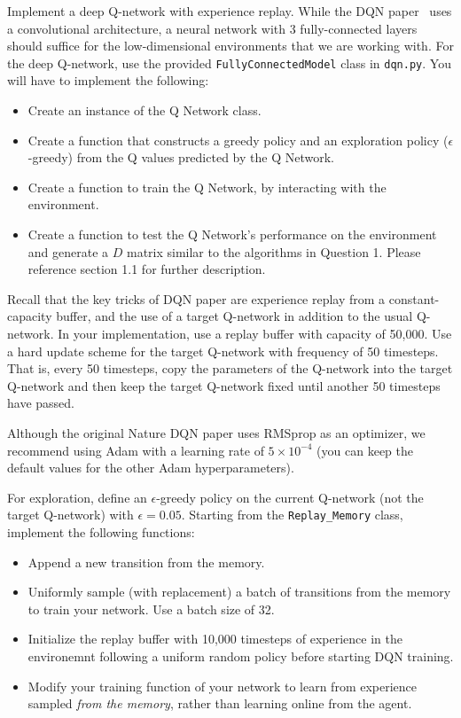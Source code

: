 \documentclass[12pt]{article}
\begin{document}
	Implement a deep Q-network with experience replay. 
	While the DQN paper~\cite{mnih2015human} uses a convolutional architecture, a neural network with 3 fully-connected layers should suffice for the low-dimensional environments that we are working with. For the deep Q-network, use the provided \texttt{FullyConnectedModel} class in \texttt{dqn.py}. You will have to implement the following:
    \begin{itemize}
        \item Create an instance of the Q Network class.
        \item Create a function that constructs a greedy policy and an exploration policy ($\epsilon$-greedy) from the Q values predicted by the Q Network.
        \item Create a function to train the Q Network, by interacting with the environment.
        \item  Create a function to test the Q Network's performance on the environment and generate a $D$ matrix similar to the algorithms in Question 1. Please reference section 1.1 for further description.
    \end{itemize}
   
   Recall that the key tricks of DQN paper are experience replay from a constant-capacity buffer, and the use of a target Q-network in addition to the usual Q-network. In your implementation, use a replay buffer with capacity of 50,000. Use a hard update scheme for the target Q-network with frequency of 50 timesteps. That is, every 50 timesteps, copy the parameters of the Q-network into the target Q-network and then keep the target Q-network fixed until another 50 timesteps have passed.
   
   Although the original Nature DQN paper uses RMSprop as an optimizer, we recommend using Adam with a learning rate of $5\times 10^{-4}$ (you can keep the default values for the other Adam hyperparameters).
   
   For exploration, define an $\epsilon$-greedy policy on the current Q-network (not the target Q-network) with $\epsilon=0.05$. Starting from the \texttt{Replay\_Memory} class, implement the following functions: 
    \begin{itemize}
        \item Append a new transition from the memory. 
        \item Uniformly sample (with replacement) a batch of transitions from the memory to train your network. Use a batch size of 32.
        \item Initialize the replay buffer with 10,000 timesteps of experience in the environemnt following a uniform random policy before starting DQN training.
        \item Modify your training function of your network to learn from experience sampled \textit{from the memory}, rather than learning online from the agent. 
    \end{itemize} 
\end{document}
